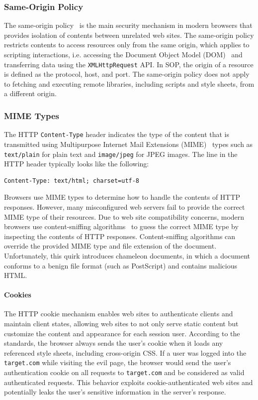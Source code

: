 \documentclass{acm_proc_article-sp}
\begin{document}
\subsubsection{Same-Origin Policy}
The same-origin policy~\cite{mozillasameorigin} is the main security mechanism in modern browsers that provides isolation of contents between unrelated web sites. The same-origin policy restricts contents to access resources only from the same origin, which applies to scripting interactions, i.e. accessing the Document Object Model (DOM)~\cite{dom} and transferring data using the \texttt{XMLHttpRequest} API. In SOP, the origin of a resource is defined as the protocol, host, and port. The same-origin policy does not apply to fetching and executing remote libraries, including scripts and style sheets, from a different origin.

\subsubsection{MIME Types}
The HTTP \texttt{Content-Type} header indicates the type of the content that is transmitted using Multipurpose Internet Mail Extensions (MIME)~\cite{mime} types such as \texttt{text/plain} for plain text and \texttt{image/jpeg} for JPEG images. The line in the HTTP header typically looks like the following:
\begin{verbatim}
Content-Type: text/html; charset=utf-8
\end{verbatim}
Browsers use MIME types to determine how to handle the contents of HTTP responses. However, many misconfigured web servers fail to provide the correct MIME type of their resources. Due to web site compatibility concerns, modern browsers use content-sniffing algorithms~\cite{securecontentsniffing} to guess the correct MIME type by inspecting the contents of HTTP responses.  Content-sniffing algorithms can override the provided MIME type and file extension of the document. Unfortunately, this quirk introduces chameleon documents, in which a document conforms to a benign file format (such as PostScript) and contains malicious HTML.

\paragraph{Cookies}
The HTTP cookie mechanism enables web sites to authenticate clients and maintain client states, allowing web sites to not only serve static content but customize the content and appearance for each session user. According to the standards, the browser always sends the user's cookie when it loads any referenced style sheets, including cross-origin CSS. If a user was logged into the \texttt{target.com} while visiting the evil page, the browser would send the user's authentication cookie on all requests to \texttt{target.com} and be considered as valid authenticated requests. This behavior exploits cookie-authenticated web sites and potentially leaks the user's sensitive information in the server's response.
\end{document}
